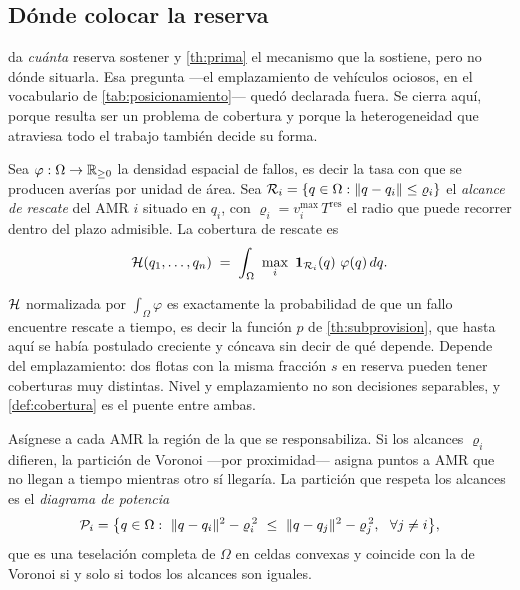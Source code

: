 \subsection{Dónde colocar la reserva}
\label{sec:cobertura}

 da \emph{cuánta} reserva sostener y \cref{th:prima} el
mecanismo que la sostiene, pero no dónde situarla. Esa pregunta —el
emplazamiento de vehículos ociosos, en el vocabulario de
\cref{tab:posicionamiento}— quedó declarada fuera. Se cierra aquí, porque
resulta ser un problema de cobertura y porque la heterogeneidad que atraviesa
todo el trabajo también decide su forma.

\begin{definicion}
\label{def:cobertura}
Sea $\varphi:\Omega\to\mathbb{R}_{\ge0}$ la densidad espacial de fallos, es decir la
tasa con que se producen averías por unidad de área. Sea
$\mathcal{R}_i=\{q\in\Omega:\lVert q-q_i\rVert\le\varrho_i\}$ el \emph{alcance de
rescate} del AMR $i$ situado en $q_i$, con
$\varrho_i=v^{\max}_i\,T^{\mathrm{res}}$ el radio que puede recorrer dentro del
plazo admisible. La cobertura de rescate es
\[
  \Hcal(q_1,\dots,q_n)\;=\;\int_\Omega\ \max_{i}\ \mathbf 1_{\Rcal_i}(q)\ \varphi(q)\,dq .
\]
\end{definicion}

\begin{observacion}
\label{obs:cobertura-p}
$\mathcal{H}$ normalizada por $\int_\Omega\varphi$ es exactamente la probabilidad de
que un fallo encuentre rescate a tiempo, es decir la función $p$ de
\cref{th:subprovision}, que hasta aquí se había postulado creciente y cóncava
sin decir de qué depende. Depende del emplazamiento: dos flotas con la misma
fracción $s$ en reserva pueden tener coberturas muy distintas. Nivel y
emplazamiento no son decisiones separables, y \cref{def:cobertura} es el puente
entre ambas.
\end{observacion}

\begin{teorema}
\label{th:potencia}
Asígnese a cada AMR la región de la que se responsabiliza. Si los alcances
$\varrho_i$ difieren, la partición de Voronoi —por proximidad— asigna puntos a
AMR que no llegan a tiempo mientras otro sí llegaría. La partición que respeta
los alcances es el \emph{diagrama de potencia}
\[
  \mathcal{P}_i=\bigl\{q\in\Omega:\ \lVert q-q_i\rVert^2-\varrho_i^{\,2}
  \ \le\ \lVert q-q_j\rVert^2-\varrho_j^{\,2},\ \ \forall j\neq i\bigr\},
\]
que es una teselación completa de $\Omega$ en celdas convexas y coincide con la
de Voronoi si y solo si todos los alcances son iguales.
\end{teorema}


